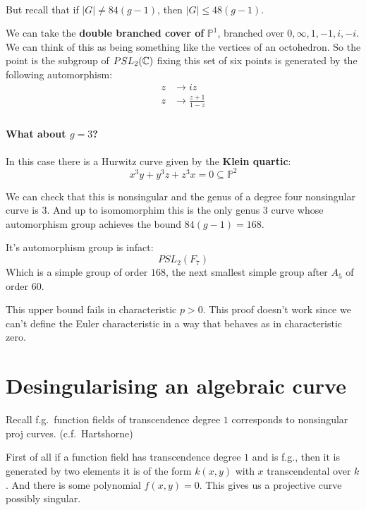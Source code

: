 \

But recall that if $|G| \neq 84(g-1)$, then $|G| \leq 48(g-1)$.

\begin{example}
    We can take the \textbf{double branched cover of }$\mathbb{P}^1$, branched over $0,\infty, 1,-1,i,-i$. We can think of this as being something like the vertices of an octohedron. So the point is the subgroup of $PSL_2(\mathbb{C})$ fixing this set of six points is generated by the following automorphism:\begin{align*}
        z&\rightarrow iz\\
        z&\rightarrow \frac{z+1}{1-z}\\
    \end{align*}
\end{example}

\paragraph*{What about $g=3$?}
In this case there is a Hurwitz curve given by the \textbf{Klein quartic}:\[x^3y+y^3z+z^3x = 0 \subseteq \mathbb{P}^2\]


We can check that this is nonsingular and the genus of a degree four nonsingular curve is $3$. And up to isomomorphim this is the only genus $3$ curve whose automorphism group achieves the bound $84(g-1) = 168$.

It's automorphism group is infact:\[PSL_2(F_7)\] Which is a simple group of order $168$, the next smallest simple group after $A_5$ of order $60$.


\begin{remark}
    This upper bound fails in characteristic $p>0$. This proof doesn't work since we can't define the Euler characteristic in a way that behaves as in characteristic zero. 
\end{remark}

\section{Desingularising an algebraic curve}
Recall f.g.~function fields of transcendence degree $1$ corresponds to nonsingular proj curves. 
(c.f.~Hartshorne)

First of all if a function field has transcendence degree $1$ and is f.g., then it is generated by two elements it is of the form $k(x,y)$ with $x$ transcendental over $k$. And there is some polynomial $f(x,y) = 0$. This gives us a projective curve possibly singular.

